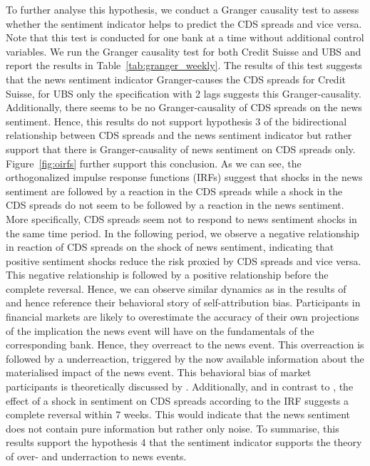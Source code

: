 To further analyse this hypothesis, we conduct a Granger causality test to assess whether the sentiment indicator helps to predict the CDS spreads and vice versa. Note that this test is conducted for one bank at a time without additional control variables. We run the Granger causality test for both Credit Suisse and UBS and report the results in \mbox{Table~\ref{tab:granger_weekly}}. The results of this test suggests that the news sentiment indicator Granger-causes the CDS spreads for Credit Suisse, for UBS only the specification with 2 lags suggests this Granger-causality. Additionally, there seems to be no Granger-causality of CDS spreads on the news sentiment. Hence, this results do not support hypothesis 3 of the bidirectional relationship between CDS spreads and the news sentiment indicator but rather support that there is Granger-causality of news sentiment on CDS spreads only. \\



\mbox{Figure~\ref{fig:oirfs}} further support this conclusion. As we can see, the orthogonalized impulse response functions (IRFs) suggest that shocks in the news sentiment are followed by a reaction in the CDS spreads while a shock in the CDS spreads do not seem to be followed by a reaction in the news sentiment. More specifically, CDS spreads seem not to respond to news sentiment shocks in the same time period. In the following period, we observe a negative relationship in reaction of CDS spreads on the shock of news sentiment, indicating that positive sentiment shocks reduce the risk proxied by CDS spreads and vice versa. This negative relationship is followed by a positive relationship before the complete reversal. Hence, we can observe similar dynamics as in the results of \cite{cathcart2020} and hence reference their behavioral story of self-attribution bias. Participants in financial markets are likely to overestimate the accuracy of their own projections of the implication the news event will have on the fundamentals of the corresponding bank. Hence, they overreact to the news event. This overreaction is followed by a underreaction, triggered by the now available information about the materialised impact of the news event. This behavioral bias of market participants is theoretically discussed by \cite{daniel1998}. Additionally, and in contrast to \cite{cathcart2020}, the effect of a shock in sentiment on CDS spreads according to the IRF suggests a complete reversal within 7 weeks. This would indicate that the news sentiment does not contain pure information but rather only noise. To summarise, this results support the hypothesis 4 that the sentiment indicator supports the theory of over- and underraction to news events. \\

